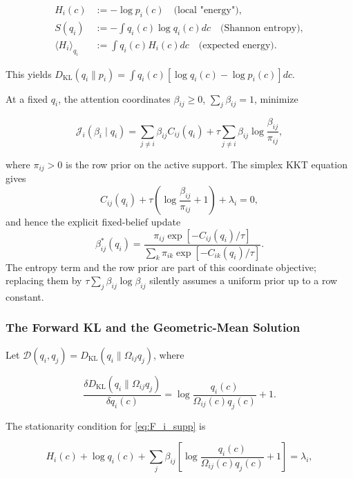 \documentclass[twoside,11pt]{article}
\begin{document}
\begin{align}
H_i(c) &:= -\log p_i(c) \quad \text{(local "energy")}, \\
S(q_i) &:= -\int q_i(c) \log q_i(c) dc \quad \text{(Shannon entropy)}, \\
\langle H_i \rangle_{q_i} &:= \int q_i(c) H_i(c) dc \quad \text{(expected energy)}.
\end{align}

This yields $D_{\mathrm{KL}}(q_i \| p_i) = \int q_i(c)[\log q_i(c) - \log p_i(c)] dc$.

At a fixed $q_i$, the attention coordinates $\beta_{ij}\ge 0$, $\sum_j\beta_{ij}=1$, minimize

\begin{equation}
\mathcal{J}_i(\beta_i\mid q_i)
=\sum_{j\neq i}\beta_{ij} C_{ij}(q_i)
+ \tau \sum_{j\neq i}\beta_{ij}\log\frac{\beta_{ij}}{\pi_{ij}},
\label{eq:J_i_supp}
\end{equation}

where $\pi_{ij}>0$ is the row prior on the active support. The simplex KKT equation gives
\begin{equation}
C_{ij}(q_i)+\tau\left(\log\frac{\beta_{ij}}{\pi_{ij}}+1\right)+\lambda_i=0,
\end{equation}
and hence the explicit fixed-belief update
\begin{equation}
\beta_{ij}^*(q_i)
=\frac{\pi_{ij}\exp[-C_{ij}(q_i)/\tau]}
{\sum_k\pi_{ik}\exp[-C_{ik}(q_i)/\tau]}.
\label{eq:beta_fixed_q_supp}
\end{equation}
The entropy term and the row prior are part of this coordinate objective; replacing them by $\tau\sum_j\beta_{ij}\log\beta_{ij}$ silently assumes a uniform prior up to a row constant.

\subsubsection{The Forward KL and the Geometric-Mean Solution}
Let $\mathcal{D}(q_i,q_j) = D_{\mathrm{KL}}(q_i \| \Omega_{ij} q_j)$, where

\[
\frac{\delta D_{\mathrm{KL}}(q_i \| \Omega_{ij} q_j)}{\delta q_i(c)}
= \log\frac{q_i(c)}{\Omega_{ij}(c) q_j(c)} + 1.
\]

The stationarity condition for \eqref{eq:F_i_supp} is

\begin{equation}
H_i(c)
+ \log q_i(c)
+ \sum_j \beta_{ij}
 \left[
\log\frac{q_i(c)}{\Omega_{ij}(c)q_j(c)}+1
\right]
= \lambda_i,
\end{equation}
\end{document}
